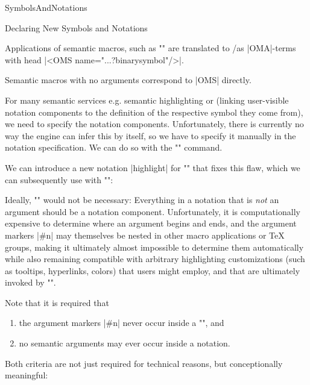 \begin{smodule}[ns=https://github.com/slatex/sTeX/doc]{SymbolsAndNotations}
\begin{sfragment}{Declaring New Symbols and Notations}
\begin{mmtbox}
  Applications of semantic macros, such as \stexcode"" are translated
  to \mmt/\omdoc as |OMA|-terms with head |<OMS name="...?binarysymbol"/>|.

  Semantic macros with no arguments correspond to |OMS| directly.
\end{mmtbox}

\begin{function}{\comp}
  For many semantic services e.g. semantic highlighting or  (linking
  user-visible notation components to the definition of the respective symbol they come
  from), we need to specify the notation components. Unfortunately, there is currently no
  way the \sTeX engine can infer this by itself, so we have to specify it manually in the
  notation specification.  We can do so with the \stexcode"\comp" command.
\end{function}

We can introduce a new notation |highlight| for \stexcode"\binarysymbol" that fixes this
flaw, which we can subsequently use with \stexcode"\binarysymbol[highlight]":


\begin{dangerbox}
  Ideally, \stexcode"\comp" would not be necessary: Everything in a notation that is
  \emph{not} an argument should be a notation component. Unfortunately, it is
  computationally expensive to determine where an argument begins and ends, and the
  argument markers |#n| may themselves be nested in other macro applications or
  \TeX\xspace groups, making it ultimately almost impossible to determine them
  automatically while also remaining compatible with arbitrary highlighting customizations
  (such as tooltips, hyperlinks, colors) that users might employ, and that are ultimately
  invoked by \stexcode"\comp".
\end{dangerbox}

\begin{dangerbox}
  Note that it is required that
  \begin{enumerate}
  \item the argument markers |#n| never occur inside a \stexcode"\comp", and
  \item no semantic arguments may ever occur inside a notation.
  \end{enumerate}
  Both criteria are not just required for technical reasons, but conceptionally
  meaningful:
        

\end{dangerbox}
\end{sfragment}
\end{smodule}
